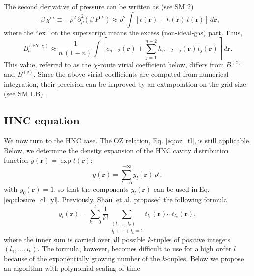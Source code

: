 \documentclass[aip,jcp,preprint,superscriptaddress,showpacs,preprintnumbers,amsmath,amssymb]{revtex4-1}
\newcommand{\vct}[1]{\mathbf{#1}}
\providecommand{\vr}{} %
\renewcommand{\vr}{\vct{r}}
\begin{document}
The second derivative of pressure can be written as (see SM 2)
%
\[
-\beta \, \chi^\mathrm{ex}
\equiv
-\rho^2 \, \partial_\rho^2 (\beta \, P^\mathrm{ex})
\approx
\rho^2 \int [c(\vr) + h(\vr) \, t(\vr)] \, d\vr,
\]
%
where the ``ex'' on the superscript means the excess (non-ideal-gas) part.
%
Thus,
%
%
%
\begin{equation}
B_n^{(\mathrm{PY}, \chi)}
\approx
\frac{1}{ n \, (1 - n) }
\int
  \left[
    c_{n-2}(\vr)
    +
    \sum_{j = 1}^{n-2} h_{n-2-j}(\vr) \, t_j(\vr)
  \right]
  \, d\vr.
\label{eq:Bn_ddP}
\end{equation}
%
%
%
This value, referred to as the $\chi$-route virial coefficient below,
differs from $B^{(c)}$ and $B^{(v)}$.
%
Since the above virial coefficients are computed
from numerical integration,
their precision can be improved
by an extrapolation on the grid size (see SM 1.B).





\subsection{\label{sec:HNC}
HNC equation}




We now turn to the HNC case.
%
The OZ relation, Eq. \eqref{eq:oz_tl}, is still applicable.
%
Below,
we determine the density expansion of
the HNC cavity distribution function
$y(\vr) = \exp t(\vr)$:
%
%
%
\begin{equation}
y(\vr)
=
\sum_{l = 0}^{+\infty}
y_l(\vr) \, \rho^l,
\label{eq:yrser}
\end{equation}
%
%
%
with $y_0(\vr) = 1$,
so that the components $y_l(\vr)$
can be used in Eq. \eqref{eq:closure_cl_yl}.
%
Previously,
Shaul et al. proposed the following formula\cite{shaul2011}
%
\[
y_l(\vr)
=
\sum_{k = 0}^l
  \frac{1}{k!}
  \sum_{ \substack{
    (l_1, \dots, l_k) \\
    l_1 + \cdots + l_k = l } }
    t_{l_1}(\vr) \cdots t_{l_k}(\vr),
\]
%
where the inner sum is carried over
all possible $k$-tuples of positive integers
$(l_1, \dots, l_k)$.
%
The formula, however,
becomes difficult to use for a high order $l$
because of the exponentially growing number of the $k$-tuples.
%
Below we propose an algorithm with polynomial scaling of time.
\end{document}
